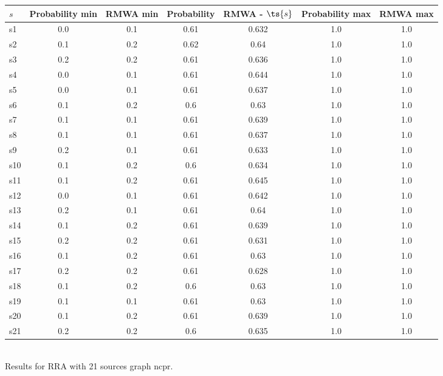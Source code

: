 \documentclass{article}
\begin{document}
\noindent\begin{tabular}{|l|c|c|c|c|c|c|}
\hline
$s$& Probability min & RMWA min & Probability & RMWA - $\ts{s}$ & Probability max & RMWA max\\
\hline
s1 &0.0 & 0.1 & 0.61 & 0.632 & 1.0 & 1.0\\
\hline
s2 &0.1 & 0.2 & 0.62 & 0.64 & 1.0 & 1.0\\
\hline
s3 &0.2 & 0.2 & 0.61 & 0.636 & 1.0 & 1.0\\
\hline
s4 &0.0 & 0.1 & 0.61 & 0.644 & 1.0 & 1.0\\
\hline
s5 &0.0 & 0.1 & 0.61 & 0.637 & 1.0 & 1.0\\
\hline
s6 &0.1 & 0.2 & 0.6 & 0.63 & 1.0 & 1.0\\
\hline
s7 &0.1 & 0.1 & 0.61 & 0.639 & 1.0 & 1.0\\
\hline
s8 &0.1 & 0.1 & 0.61 & 0.637 & 1.0 & 1.0\\
\hline
s9 &0.2 & 0.1 & 0.61 & 0.633 & 1.0 & 1.0\\
\hline
s10 &0.1 & 0.2 & 0.6 & 0.634 & 1.0 & 1.0\\
\hline
s11 &0.1 & 0.2 & 0.61 & 0.645 & 1.0 & 1.0\\
\hline
s12 &0.0 & 0.1 & 0.61 & 0.642 & 1.0 & 1.0\\
\hline
s13 &0.2 & 0.1 & 0.61 & 0.64 & 1.0 & 1.0\\
\hline
s14 &0.1 & 0.2 & 0.61 & 0.639 & 1.0 & 1.0\\
\hline
s15 &0.2 & 0.2 & 0.61 & 0.631 & 1.0 & 1.0\\
\hline
s16 &0.1 & 0.2 & 0.61 & 0.63 & 1.0 & 1.0\\
\hline
s17 &0.2 & 0.2 & 0.61 & 0.628 & 1.0 & 1.0\\
\hline
s18 &0.1 & 0.2 & 0.6 & 0.63 & 1.0 & 1.0\\
\hline
s19 &0.1 & 0.1 & 0.61 & 0.63 & 1.0 & 1.0\\
\hline
s20 &0.1 & 0.2 & 0.61 & 0.639 & 1.0 & 1.0\\
\hline
s21 &0.2 & 0.2 & 0.6 & 0.635 & 1.0 & 1.0\\
\hline
\end{tabular}\\

\noindent Results for RRA with 21 sources graph ncpr.
\end{document}
